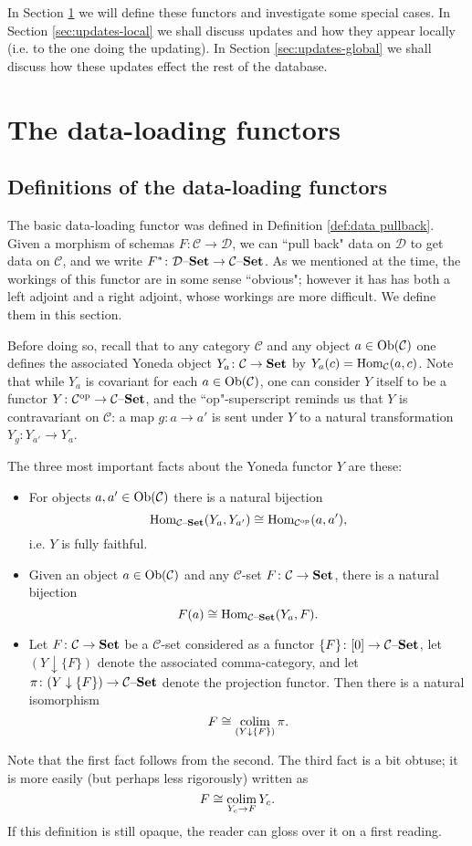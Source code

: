 \documentclass{amsart}
\def\tn{\textnormal}
\def\mc{\mathcal}
\def\Hom{\tn{Hom}}
\def\Ob{\tn{Ob}}
\def\to{\rightarrow}
\def\taking{\colon}
\def\iso{\cong}
\def\down{\downarrow}
\def\op{^\tn{op}}
\def\Set{{\bf Set}}
\def\set{{\text \textendash}{\bf Set}}
\def\colim{\mathop{\tn{colim}}}
\def\mcC{\mc{C}}
\def\mcD{\mc{D}}
\theoremstyle{remark}
\theoremstyle{definition}
\begin{document}
In Section \ref{sec:dlf} we will define these functors and investigate some special cases.  In Section \ref{sec:updates-local} we shall discuss updates and how they appear locally (i.e. to the one doing the updating).  In Section \ref{sec:updates-global} we shall discuss how these updates effect the rest of the database.

\section{The data-loading functors}\label{sec:dlf}

\subsection{Definitions of the data-loading functors}

The basic data-loading functor was defined in Definition \ref{def:data pullback}.  Given a morphism of schemas $F\taking\mcC\to\mcD$, we can ``pull back" data on $\mcD$ to get data on $\mcC$, and we write $F^*\taking\mcD\set\to\mcC\set$.  As we mentioned at the time, the workings of this functor are in some sense ``obvious"; however it has has both a left adjoint and a right adjoint, whose workings are more difficult.  We define them in this section.

Before doing so, recall that to any category $\mcC$ and any object $a\in\Ob(\mcC)$ one defines the associated Yoneda object $Y_a\taking\mcC\to\Set$ by $Y_a(c)=\Hom_\mcC(a,c)$.  Note that while $Y_a$ is covariant for each $a\in\Ob(\mcC)$, one can consider $Y$ itself to be a functor $Y\taking\mcC\op\to\mcC\set$, and the ``op"-superscript reminds us that $Y$ is contravariant on $\mcC$: a map $g\taking a\to a'$ is sent under $Y$ to a natural transformation $Y_g\taking Y_{a'}\to Y_a$.

The three most important facts about the Yoneda functor $Y$ are these:\begin{itemize} \item For objects $a,a'\in\Ob(\mcC)$ there is a natural bijection $$\Hom_{\mcC\set}(Y_a,Y_{a'})\iso\Hom_{\mcC\op}(a,a'),$$ i.e. $Y$ is fully faithful.\item Given an object $a\in\Ob(\mcC)$ and any $\mcC$-set $F\taking\mcC\to\Set$, there is a natural bijection $$F(a)\iso\Hom_{\mcC\set}(Y_a,F).$$\item Let $F\taking\mcC\to\Set$ be a $\mcC$-set considered as a functor $\{F\}\taking[0]\to\mcC\set$, let $(Y\down\{F\})$ denote the associated comma-category, and let $\pi\taking(Y\down\{F\})\to\mcC\set$ denote the projection functor.  Then there is a natural isomorphism $$F\iso\colim_{(Y\down\{F\})}\pi.$$\end{itemize}  Note that the first fact follows from the second.  The third fact is a bit obtuse; it is more easily (but perhaps less rigorously) written as $$F\iso\colim_{Y_c\to F}Y_c.$$  If this definition is still opaque, the reader can gloss over it on a first reading.
\end{document}
